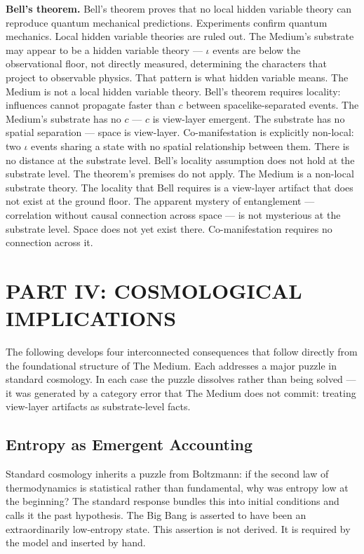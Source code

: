 \documentclass[11pt,letterpaper]{article}
\begin{document}
\textbf{Bell's theorem.} Bell's theorem proves that no local hidden variable theory can reproduce quantum mechanical predictions. Experiments confirm quantum mechanics. Local hidden variable theories are ruled out. The Medium's substrate may appear to be a hidden variable theory --- \(\iota\) events are below the observational floor, not directly measured, determining the characters that project to observable physics. That pattern is what hidden variable means. The Medium is not a local hidden variable theory. Bell's theorem requires locality: influences cannot propagate faster than \(c\) between spacelike-separated events. The Medium's substrate has no \(c\) --- \(c\) is view-layer emergent. The substrate has no spatial separation --- space is view-layer. Co-manifestation is explicitly non-local: two \(\iota\) events sharing a state with no spatial relationship between them. There is no distance at the substrate level. Bell's locality assumption does not hold at the substrate level. The theorem's premises do not apply. The Medium is a non-local substrate theory. The locality that Bell requires is a view-layer artifact that does not exist at the ground floor. The apparent mystery of entanglement --- correlation without causal connection across space --- is not mysterious at the substrate level. Space does not yet exist there. Co-manifestation requires no connection across it.


\section{PART IV: COSMOLOGICAL IMPLICATIONS}
\label{sec:org3090969}

The following develops four interconnected consequences that follow directly from the foundational structure of The Medium. Each addresses a major puzzle in standard cosmology. In each case the puzzle dissolves rather than being solved --- it was generated by a category error that The Medium does not commit: treating view-layer artifacts as substrate-level facts.

\subsection{Entropy as Emergent Accounting}
\label{sec:orgd9ef8cf}

Standard cosmology inherits a puzzle from Boltzmann: if the second law of thermodynamics is statistical rather than fundamental, why was entropy low at the beginning? The standard response bundles this into initial conditions and calls it the past hypothesis. The Big Bang is asserted to have been an extraordinarily low-entropy state. This assertion is not derived. It is required by the model and inserted by hand.
\end{document}
